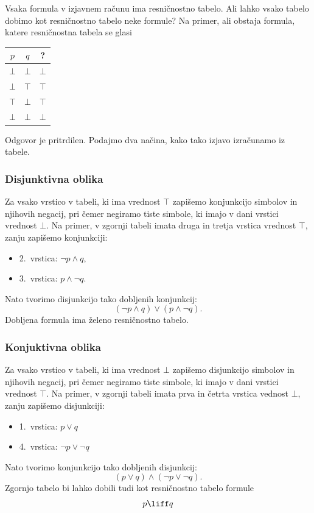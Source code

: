 Vsaka formula v izjavnem računu ima resničnostno tabelo. Ali lahko vsako tabelo
dobimo kot resničnostno tabelo neke formule? Na primer, ali obstaja formula,
katere resničnostna tabela se glasi
%
\begin{center}
  \begin{tabular}{ccc}
    \toprule
    $p$ & $q$ & ? \\ \midrule
    $\bot$ & $\bot$ & $\bot$ \\
    $\bot$ & $\top$ & $\top$ \\
    $\top$ & $\bot$ & $\top$ \\
    $\bot$ & $\bot$ & $\bot$ \\
    \bottomrule
  \end{tabular}
\end{center}
%
Odgovor je pritrdilen. Podajmo dva načina, kako tako izjavo izračunamo iz tabele.

\subsubsection{Disjunktivna oblika}
\label{sec:disjunktivna-oblika}

Za vsako vrstico v tabeli, ki ima vrednost $\top$ zapišemo konjunkcijo simbolov in
njihovih negacij, pri čemer negiramo tiste simbole, ki imajo v dani vrstici vrednost
$\bot$. Na primer, v zgornji tabeli imata druga in tretja vrstica vrednost $\top$, zanju
zapišemo konjunkciji:
%
\begin{itemize}
\item 2.~vrstica: $\neg p \land q$,
\item 3.~vrstica: $p \land \neg q$.
\end{itemize}
%
Nato tvorimo disjunkcijo tako dobljenih konjunkcij:
%
\begin{equation*}
  (\neg p \land q) \lor (p \land \neg q).
\end{equation*}
%
Dobljena formula ima želeno resničnostno tabelo.

\subsubsection{Konjuktivna oblika}
\label{sec:konjuktivna-oblika}

Za vsako vrstico v tabeli, ki ima vrednost $\bot$ zapišemo
disjunkcijo simbolov in njihovih negacij, pri čemer negiramo tiste simbole, ki
imajo v dani vrstici vrednost $\top$. Na primer, v zgornji tabeli imata prva in
četrta vrstica vednost $\bot$, zanju zapišemo disjunkciji:
%
\begin{itemize}
\item 1.~vrstica: $p \lor q$
\item 4.~vrstica: $\neg p \lor \neg q$
\end{itemize}
%
Nato tvorimo konjunkcijo tako dobljenih disjunkcij:
%
\begin{equation*}
  (p \lor q) \land (\neg p \lor \neg q).
\end{equation*}
%
Zgornjo tabelo bi lahko dobili tudi kot resničnostno tabelo formule
%
\begin{equation*}
    p \liff q
\end{equation*}

